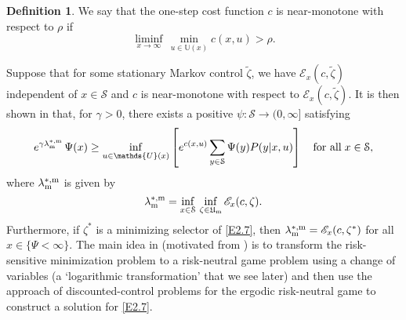\documentclass[notitlepage,11pt,reqno]{amsart}
\numberwithin{equation}{section}
\theoremstyle{plain}
\theoremstyle{definition}
\newtheorem{definition}{Definition}[section]
\theoremstyle{remark}
\newcommand{\Act}{{\mathds{U}}}
\newcommand{\sE}{{\mathscr{E}}}     %
\newcommand{\cS}{{\mathcal{S}}}     %
\newcommand{\Um}{\mathfrak{U}_{\mathrm{m}}}
\begin{document}
\begin{definition}\label{D2.2}
We say that the one-step cost function $c$ is near-monotone with
respect to $\rho$ if
$$\liminf_{x\to\infty}\, \min_{u\in\Act(x)} c(x, u)>\rho.$$
\end{definition}
Suppose that for some stationary Markov control $\tilde\zeta$, we have $\sE_x(c, \tilde\zeta)$ independent of $x\in\cS$ and $c$ is near-monotone with respect to $\sE_x(c, \tilde\zeta)$. It is then shown in 
\cite{MR1709324} that, for $\gamma>0$, there exists a positive $\psi:\cS\to (0, \infty]$ satisfying 
\begin{equation}\label{E2.7}
e^{\gamma\lambda^{*,{\rm m}}_{\rm m}}\, \Psi(x)\geq \inf_{u\in\Act(x)} \left[e^{c(x, u)} \sum_{y\in\cS} \Psi(y) P(y|x, u)\right]\quad \text{for all}\; x\in \cS,
\end{equation}
where $\lambda^{*,{\rm m}}_{\rm m}$ is given by 
\begin{equation}\label{E2.8}
\lambda^{*,{\rm m}}_{\rm m}=\inf_{x\in\cS}\, \inf_{\zeta\in\Um}\sE_x(c, \zeta).
\end{equation}
Furthermore, if $\zeta^*$ is a minimizing selector of \eqref{E2.7}, then $\lambda^{*,{\rm m}}_{\rm m}=\sE_x(c, \zeta^*)$ for all $x\in \{\Psi<\infty\}$. The main idea in
\cite{MR1709324} (motivated from \cite{MR1466928}) is to transform the risk-sensitive minimization problem to a risk-neutral game problem using a change of variables (a `logarithmic transformation' that we see later)
and then use the approach of discounted-control problems for the ergodic risk-neutral game to construct a solution for \eqref{E2.7}.
\end{document}
